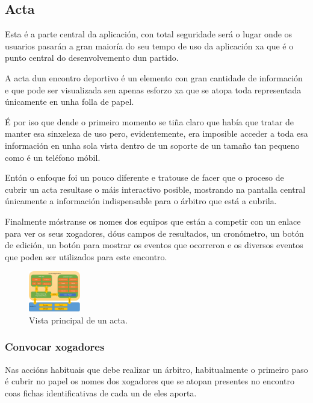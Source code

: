     \subsection{Acta}
    Esta é a parte central da aplicación, con total seguridade será o lugar 
onde os usuarios pasarán a gran maioría do seu tempo de uso da aplicación xa 
que é o punto central do desenvolvemento dun partido.

    A acta dun encontro deportivo é un elemento con gran cantidade de 
información e que pode ser visualizada sen apenas esforzo xa que se atopa 
toda representada únicamente en unha folla de papel.

    É por iso que dende o primeiro momento se tiña claro que había que tratar 
de manter esa sinxeleza de uso pero, evidentemente, era imposible acceder a 
toda esa información en unha sola vista dentro de un soporte de un tamaño tan 
pequeno como é un teléfono móbil.

    Entón o enfoque foi un pouco diferente e tratouse de facer que o proceso de 
cubrir un acta resultase o máis interactivo posible, mostrando na pantalla 
central únicamente a información indispensable para o árbitro que está a 
cubrila.

    Finalmente móstranse os nomes dos equipos que están a competir con un 
enlace para ver os seus xogadores, dóus campos de resultados, un 
cronómetro, un botón de edición, un botón para mostrar os eventos que 
ocorreron e os diversos eventos que poden ser utilizados para este encontro.

    \begin{figure}[h!]
      \begin{center}
      \includegraphics[width=0.2\textwidth]{./img/cordova_arquitectura.png}
      \caption{Vista principal de un acta.}
      \end{center}
    \end{figure}

      \subsubsection{Convocar xogadores}
      Nas accións habituais que debe realizar un árbitro, habitualmente o 
primeiro paso é cubrir no papel os nomes dos xogadores que se atopan presentes 
no encontro coas fichas identificativas de cada un de eles aporta.

